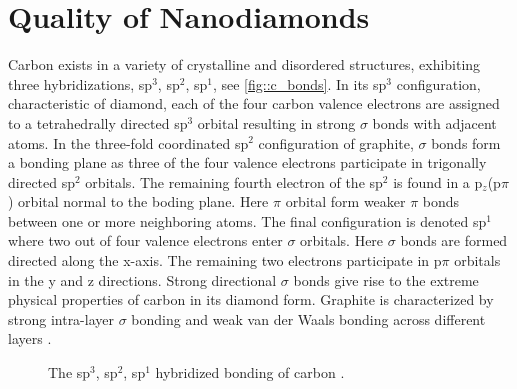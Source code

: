
\chapter{Quality of Nanodiamonds}	\label{ch::crystal_quality}

		Carbon exists in a variety of crystalline and disordered structures, exhibiting three hybridizations, sp$^3$, sp$^2$, sp$^1$, see  \autoref{fig::c_bonds}. In its sp$^3$ configuration, characteristic of diamond, each of the four carbon valence electrons are assigned to a tetrahedrally directed sp$^3$ orbital resulting in strong $\sigma$ bonds with adjacent atoms.
		In the three-fold coordinated sp$^2$ configuration of graphite, $\sigma$ bonds form a bonding plane as three of the four valence electrons participate in trigonally directed sp$^2$ orbitals. The remaining fourth electron of the sp$^2$ is found in a p$_z$(p$\pi$) orbital normal to the boding plane. Here $\pi$ orbital form weaker $\pi$ bonds between one or more neighboring atoms.
		The final configuration is denoted sp$^1$ where two out of four valence electrons enter $\sigma$ orbitals. Here $\sigma$ bonds are formed directed along the x-axis. The remaining two electrons participate in p$\pi$ orbitals in the y and z directions.
		Strong directional $\sigma$ bonds give rise to the extreme physical properties of carbon in its diamond form. Graphite is characterized by strong intra-layer $\sigma$ bonding and weak van der Waals bonding across different layers \cite{Robertson2002}.

		\begin{figure}[htb]
			\centering
			\caption[Carbon hybridizations]{The sp$^3$, sp$^2$, sp$^1$ hybridized bonding of carbon \cite{Robertson1986}.}
			\label{fig::c_bonds}
		\end{figure}


